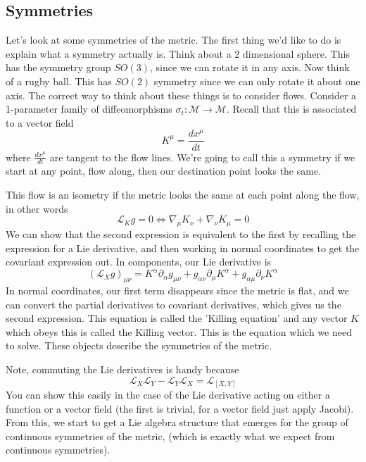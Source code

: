 \subsection{Symmetries}
Let's look at some symmetries of the metric. 
The first thing we'd like to do is explain what a symmetry actually is. 
Think about a 2 dimensional sphere. 
This has the symmetry group $ SO ( 3) $, 
since we can rotate it in any axis. Now think 
of a rugby ball. This has $ SO ( 2) $ symmetry since 
we can only rotate it about one axis. 
The correct way to think about these things is to consider flows. 
Consider a 1-parameter family of diffeomorphisms 
$ \sigma _ t : \mathcal{ M } \to \mathcal{ M } $. 
Recall that this is associated to a vector field 
\[
 K^ \mu =  \frac{dx ^ \mu }{ dt }
\] where $ \frac{ d x ^ \mu }{ dt } $ are tangent to the flow lines. 
We're going to call this a symmetry if we start at any point, 
flow along, then our destination point looks the same.

This flow is an isometry if the metric 
looks the same at each point along the flow, in other words 
\[
 \mathcal{ L }_K g = 0 \iff \nabla _ \mu K _ \nu + \nabla _ \nu K _ \mu  =0 
\] We can show that the second expression 
is equivalent to the first by recalling the expression 
for a Lie derivative, and then working in normal coordinates to 
get the covariant expression out. 
In components, our Lie derivative is 
\[
	( \mathcal{ L } _ X g )_{ \mu \nu }  =  K ^ \alpha \partial  _ \alpha g _{ \mu \nu } 
	 + g_{ \alpha \nu } \partial  _ \mu K ^ \alpha + 
	 g _{ \alpha \mu } \partial  _ \nu K ^ \alpha 
 \] In normal coordinates, our first term 
 disappears since the metric is flat, and we 
 can convert the partial derivatives to covariant derivatives, 
 which gives us the second expression. This equation is 
called the 'Killing equation' and any vector $ K  $ which 
obeys this is 
called the Killing vector. 
This is the equation which we need to solve. 
These objects describe the symmetries of the metric. 

Note, commuting the Lie derivatives is handy because 
\[
	\mathcal{ L } _ X \mathcal{ L } _ Y - \mathcal{ L } _ Y \mathcal{ L } _ X  = \mathcal{ L } _{ [ X, Y ] }
\] You can 
show this easily in the case of the Lie derivative 
acting on either a function or a vector field (the first is trivial, 
for a vector field just apply Jacobi). From this, we start to get a Lie 
algebra structure that emerges for the group 
of continuous symmetries of the metric, (which 
is exactly what we expect from continuous symmetries).

